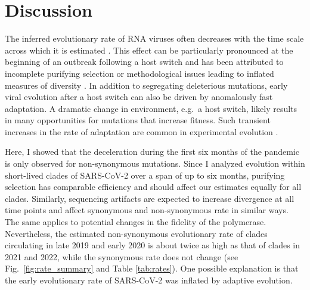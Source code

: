 \documentclass[aps,rmp, twocolumn]{revtex4}
\begin{document}
\section*{Discussion}
The inferred evolutionary rate of RNA viruses often decreases with the time scale across which it is estimated \citep{wertheim_purifying_2011,ghafari_prisoner_2021}.
This effect can be particularly pronounced at the beginning of an outbreak following a host switch and has been attributed to incomplete purifying selection or methodological issues leading to inflated measures of diversity \citep{meyer_time_2015,ghafari_purifying_2022}.
In addition to segregating deleterious mutations, early viral evolution after a host switch can also be driven by anomalously fast adaptation.
A dramatic change in environment, e.g.~a host switch, likely results in many opportunities for mutations that increase fitness.
Such transient increases in the rate of adaptation are common in experimental evolution \citep{elena_virus_2007}.

Here, I showed that the deceleration during the first six months of the pandemic is only observed for non-synonymous mutations.
Since I analyzed evolution within short-lived clades of SARS-CoV-2 over a span of up to six months, purifying selection has comparable efficiency and should affect our estimates equally for all clades.
Similarly, sequencing artifacts are expected to increase divergence at all time points and affect synonymous and non-synonymous rate in similar ways.
The same applies to potential changes in the fidelity of the polymerase.
Nevertheless, the estimated non-synonymous evolutionary rate of clades circulating in late 2019 and early 2020 is about twice as high as that of clades in 2021 and 2022, while the synonymous rate does not change (see Fig.~\ref{fig:rate_summary} and Table \ref{tab:rates}).
One possible explanation is that the early evolutionary rate of SARS-CoV-2 was inflated by adaptive evolution.
\end{document}
